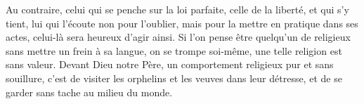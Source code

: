 Au contraire, celui qui se penche sur la loi parfaite, celle de la liberté,
		et qui s’y tient,
	lui qui l’écoute non pour l’oublier,
	mais pour la mettre en pratique dans ses actes,
	celui-là sera heureux d’agir ainsi.
Si l’on pense être quelqu’un de religieux sans mettre un frein à sa langue,
	on se trompe soi-même, une telle religion est sans valeur.
Devant Dieu notre Père, un comportement religieux pur et sans souillure,
	c’est de visiter les orphelins et les veuves dans leur détresse,
	et de se garder sans tache au milieu du monde.
